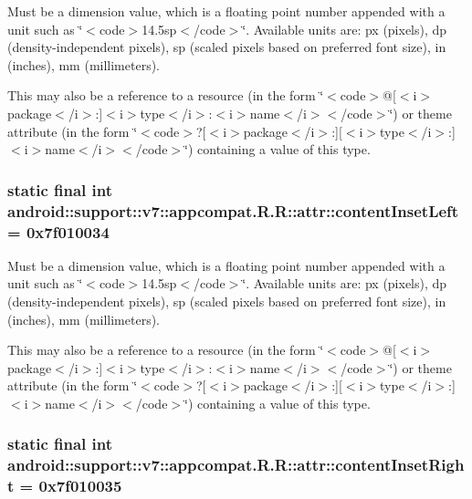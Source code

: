 Must be a dimension value, which is a floating point number appended with a unit such as \char`\"{}$<$code$>$14.5sp$<$/code$>$\char`\"{}. Available units are: px (pixels), dp (density-independent pixels), sp (scaled pixels based on preferred font size), in (inches), mm (millimeters). 

This may also be a reference to a resource (in the form \char`\"{}$<$code$>$@\mbox{[}$<$i$>$package$<$/i$>$:\mbox{]}$<$i$>$type$<$/i$>$:$<$i$>$name$<$/i$>$$<$/code$>$\char`\"{}) or theme attribute (in the form \char`\"{}$<$code$>$?\mbox{[}$<$i$>$package$<$/i$>$:\mbox{]}\mbox{[}$<$i$>$type$<$/i$>$:\mbox{]}$<$i$>$name$<$/i$>$$<$/code$>$\char`\"{}) containing a value of this type. \hypertarget{classandroid_1_1support_1_1v7_1_1appcompat_1_1_r_1_1attr_0092c16e514b074aa8a3947fdd0bf4ce}{
\subsubsection[{contentInsetLeft}]{\setlength{\rightskip}{0pt plus 5cm}static final int android::support::v7::appcompat.R.R::attr::contentInsetLeft = 0x7f010034}}
\label{classandroid_1_1support_1_1v7_1_1appcompat_1_1_r_1_1attr_0092c16e514b074aa8a3947fdd0bf4ce}


Must be a dimension value, which is a floating point number appended with a unit such as \char`\"{}$<$code$>$14.5sp$<$/code$>$\char`\"{}. Available units are: px (pixels), dp (density-independent pixels), sp (scaled pixels based on preferred font size), in (inches), mm (millimeters). 

This may also be a reference to a resource (in the form \char`\"{}$<$code$>$@\mbox{[}$<$i$>$package$<$/i$>$:\mbox{]}$<$i$>$type$<$/i$>$:$<$i$>$name$<$/i$>$$<$/code$>$\char`\"{}) or theme attribute (in the form \char`\"{}$<$code$>$?\mbox{[}$<$i$>$package$<$/i$>$:\mbox{]}\mbox{[}$<$i$>$type$<$/i$>$:\mbox{]}$<$i$>$name$<$/i$>$$<$/code$>$\char`\"{}) containing a value of this type. \hypertarget{classandroid_1_1support_1_1v7_1_1appcompat_1_1_r_1_1attr_ad98300ae474b2854f159d4c8dadb7bf}{
\subsubsection[{contentInsetRight}]{\setlength{\rightskip}{0pt plus 5cm}static final int android::support::v7::appcompat.R.R::attr::contentInsetRight = 0x7f010035}}
\label{classandroid_1_1support_1_1v7_1_1appcompat_1_1_r_1_1attr_ad98300ae474b2854f159d4c8dadb7bf}


